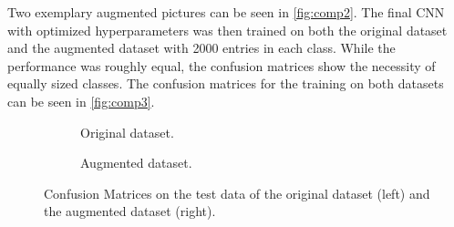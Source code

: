 \noindent
Two exemplary augmented pictures can be seen in \autoref{fig:comp2}. The final CNN with optimized hyperparameters was then trained on both the original dataset and the augmented dataset with 2000 entries in each class. While the performance was roughly equal, the confusion matrices show the necessity of equally sized classes.
The confusion matrices for the training on both datasets can be seen in \autoref{fig:comp3}. 
\begin{figure}[H]
    \centering
    \begin{subfigure}{0.49\textwidth}
        \centering
        \caption{Original dataset.}
    \end{subfigure}
    \hfill
    \begin{subfigure}{0.49\textwidth}
        \centering
        \caption{Augmented dataset.}
    \end{subfigure}
    \caption{Confusion Matrices on the test data of the original dataset (left) and the augmented dataset (right).}
    \label{fig:comp3}
\end{figure}
